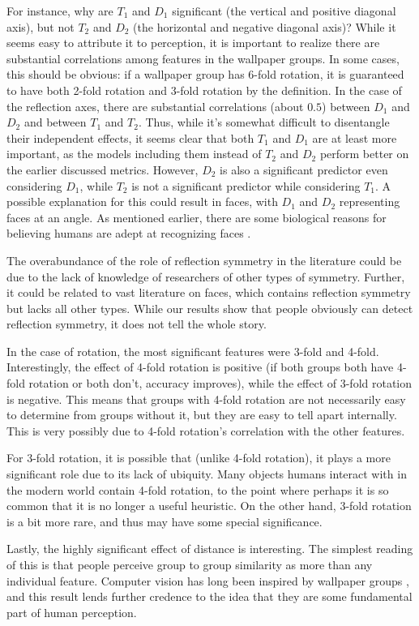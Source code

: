 For instance, why are $T_1$ and $D_1$ significant (the vertical and positive diagonal axis), but not $T_2$ and $D_2$ (the horizontal and negative diagonal axis)? While it seems easy to attribute it to perception, it is important to realize there are substantial correlations among features in the wallpaper groups. In some cases, this should be obvious: if a wallpaper group has 6-fold rotation, it is guaranteed to have both 2-fold rotation and 3-fold rotation by the definition. In the case of the reflection axes, there are substantial correlations (about $0.5$) between $D_1$ and $D_2$ and between $T_1$ and $T_2$. Thus, while it's somewhat difficult to disentangle their independent effects, it seems clear that both $T_1$ and $D_1$ are at least more important, as the models including them instead of $T_2$ and $D_2$ perform better on the earlier discussed metrics. However, $D_2$ is also a significant predictor even considering $D_1$, while $T_2$ is not a significant predictor while considering $T_1$. A possible explanation for this could result in faces, with $D_1$ and $D_2$ representing faces at an angle. As mentioned earlier, there are some biological reasons for believing humans are adept at recognizing faces \cite{ffa}.     

The overabundance of the role of reflection symmetry in the literature could be due to the lack of knowledge of researchers of other types of symmetry. Further, it could be related to vast literature on faces, which contains reflection symmetry but lacks all other types. While our results show that people obviously can detect reflection symmetry, it does not tell the whole story.

In the case of rotation, the most significant features were 3-fold and 4-fold. Interestingly, the effect of 4-fold rotation is positive (if both groups both have 4-fold rotation or both don't, accuracy improves), while the effect of 3-fold rotation is negative. This means that groups with 4-fold rotation are not necessarily easy to determine from groups without it, but they are easy to tell apart internally. This is very possibly due to 4-fold rotation's correlation with the other features.

For 3-fold rotation, it is possible that (unlike 4-fold rotation), it plays a more significant role due to its lack of ubiquity. Many objects humans interact with in the modern world contain 4-fold rotation, to the point where perhaps it is so common that it is no longer a useful heuristic. On the other hand, 3-fold rotation is a bit more rare, and thus may have some special significance.

Lastly, the highly significant effect of distance is interesting. The simplest reading of this is that people perceive group to group similarity as more than any individual feature. Computer vision has long been inspired by wallpaper groups \citep{yanxi1}\citep{yanxi2}, and this result lends further credence to the idea that they are some fundamental part of human perception.
